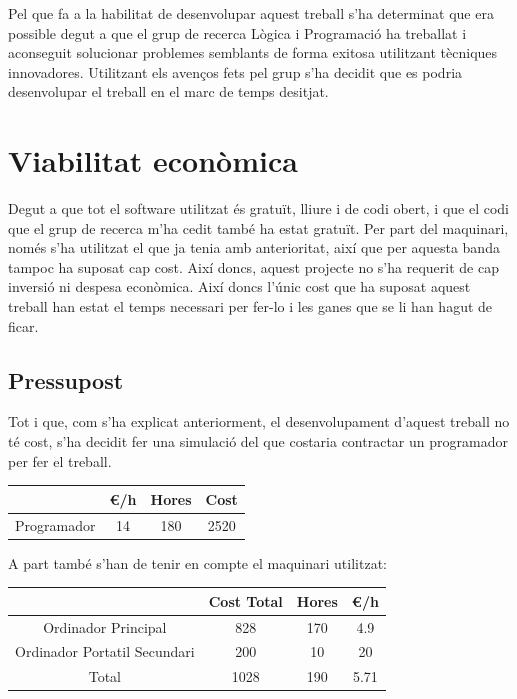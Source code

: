\documentclass[11pt,a4paper,twoside]{report}
\begin{document}
  Pel que fa a la habilitat de desenvolupar aquest treball s'ha determinat que era possible degut a que 
  el grup de recerca Lògica i Programació ha treballat i aconseguit solucionar problemes semblants de forma exitosa utilitzant tècniques innovadores. 
  Utilitzant els avenços fets pel grup s'ha decidit que es podria desenvolupar el treball en el marc de temps desitjat.



  \section{Viabilitat econòmica}
  
  Degut a que tot el software utilitzat és gratuït, lliure i de codi obert, i que el codi que el grup de recerca m'ha cedit també ha estat gratuït. Per part del maquinari, només s'ha utilitzat el que ja tenia amb anterioritat, així que per aquesta banda tampoc ha suposat cap cost.
  Així doncs, aquest projecte no s'ha requerit de cap inversió ni despesa econòmica. 
  Així doncs l'únic cost que ha suposat aquest treball han estat el temps necessari per fer-lo i les ganes que se li han hagut de ficar. 


  \subsection{Pressupost}
  Tot i que, com s'ha explicat anteriorment, el desenvolupament d'aquest treball no té cost, s'ha decidit fer una simulació del que costaria contractar un programador per fer el treball.
  
  \begin{center}
    \begin{tabular}{|| c | c | c | c||} 
    \hline
     & \euro/h & Hores & Cost \\ [0.5ex] 
    \hline\hline
    Programador & 14 & 180 & 2520 \\ [1ex] 
    \hline
   \end{tabular}
   \end{center}

   A part també s'han de tenir en compte el maquinari utilitzat:
   \begin{center}
    \begin{tabular}{|| c | c | c | c||} 
    \hline
     & Cost Total & Hores & \euro/h \\ [0.5ex] 
    \hline\hline
    Ordinador Principal & 828 & 170 & 4.9 \\ [1ex] 
    Ordinador Portatil Secundari & 200 & 10 & 20 \\ [1ex] 
    \hline\hline
    Total & 1028 & 190 & 5.71 \\


    \hline
   \end{tabular}
   \end{center}
\end{document}
